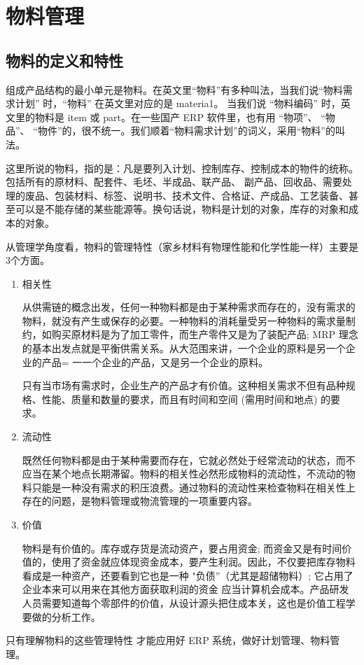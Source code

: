 \section {物料管理}

\subsection {物料的定义和特性}

    组成产品结构的最小单元是物料。在英文里“物料”有多种叫法，当我们说“物料需求计划” 时，“物料” 在英文里对应的是 materia1。 当我们说 “物料编码” 时，英文里的物料是 item 或 part。在一些国产 ERP 软件里，也有用 “物项”、 “物品”、 “物件”的，很不统一。我们顺着“物料需求计划”的词义，采用“物料”的叫法。

    这里所说的物料，指的是：凡是要列入计划、控制库存、控制成本的物件的统称。包括所有的原材料、配套件、毛坯、半成品、联产品、 副产品、回收品、需要处理的废品、包装材料、标签、说明书、技术文件、合格证、产成品、工艺装备、甚至可以是不能存储的某些能源等。换句话说，物料是计划的对象，库存的对象和成本的对象。

    从管理学角度看，物料的管理特性（家乡材料有物理性能和化学性能一样）主要是3个方面。

    \begin{enumerate}
        \item 相关性

        从供需链的概念出发，任何一种物料都是由于某种需求而存在的，没有需求的物料，就没有产生或保存的必要。一种物料的消耗量受另一种物料的需求量制约，如购买原材料是为了加工零件，而生产零件又是为了装配产品; MRP 理念的基本出发点就是平衡供需关系。从大范围来讲，一个企业的原料是另一个企业的产品= 一一个企业的产品，又是另一个企业的原料。

        只有当市场有需求时，企业生产的产品才有价值。这种相关需求不但有品种规格、性能、质量和数量的要求，而且有时间和空间 (需用时间和地点) 的要求。

        \item 流动性

        既然任何物料都是由于某种需要而存在，它就必然处于经常流动的状态，而不应当在某个地点长期滞留。物料的相关性必然形成物料的流动性，不流动的物料只能是一种没有需求的积压浪费。通过物料的流动性来检查物料在相关性上存在的问题，是物料管理或物流管理的一项重要内容。

        \item 价值

        物料是有价值的。库存或存货是流动资产，要占用资金; 而资金又是有时间价值的，使用了资金就应体现资金成本，要产生利润。因此，不仅要把库存物料看成是一种资产，还要看到它也是一种 "负债”（尤其是超储物料）; 它占用了企业本来可以用来在其他方面获取利润的资金 应当计算机会成本。产品研发人员需要知道每个零部件的价值，从设计源头把住成本关，这也是价值工程学要做的分析工作。

    \end{enumerate}

    只有理解物料的这些管理特性 才能应用好 ERP 系统，做好计划管理、物料管理。
